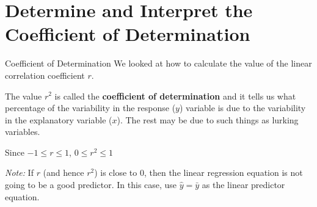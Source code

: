 \documentclass[t]{beamer}
\begin{document}
\section{Determine and Interpret the Coefficient of Determination}

\begin{frame}{Coefficient of Determination}
We looked at how to calculate the value of the linear correlation coefficient $r$. \newline\\	\pause

The value $r^2$ is called the {\color{blue}\textbf{coefficient of determination}} and it tells us what percentage of the variability in the response ($y$) variable is due to the variability in the explanatory variable ($x$). The rest may be due to such things as lurking variables.	\newline\\	\pause

Since $-1 \leq r \leq 1$, $0 \leq r^2 \leq 1$ \newline\\ \pause

\emph{Note:} If $r$ (and hence $r^2$) is close to 0, then the linear regression equation is not going to be a good predictor. In this case, use $\hat{y} = \bar{y}$ as the linear predictor equation.
\end{frame}
\end{document}
